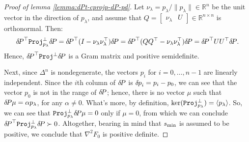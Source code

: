 \documentclass[smallcondensed]{svjour3}
\begin{document}
\begin{proof}[Proof of lemma \ref{lemma:dPt-cprojp-dP-pd}]

  Let $\nu_\lambda = p_\lambda/\|p_\lambda\| \in \mathbb{R}^n$ be the unit
  vector in the direction of $p_\lambda$, and assume that
  $Q = \begin{bmatrix} \nu_\lambda & U \end{bmatrix} \in \mathbb{R}^{n
    \times n}$ is orthonormal. Then:
  \begin{equation}
    {\delta \hspace{-0.14em} P}^\top \mathtt{Proj}^\perp_{p_\lambda} {\delta \hspace{-0.14em} P} = {\delta \hspace{-0.14em} P}^\top {(I - \nu_\lambda \nu_\lambda^\top)} {\delta \hspace{-0.14em} P} = {\delta \hspace{-0.14em} P}^\top {(QQ^\top - \nu_\lambda \nu_\lambda^\top)} {\delta \hspace{-0.14em} P} = {\delta \hspace{-0.14em} P}^\top U U^\top {\delta \hspace{-0.14em} P}.
  \end{equation}
  Hence, ${\delta \hspace{-0.14em} P}^\top \mathtt{Proj}^\perp {\delta \hspace{-0.14em} P}$ is a Gram matrix
  and positive semidefinite.

  Next, since $\Delta^n$ is nondegenerate, the vectors $p_i$ for
  $i = 0, \hdots, n - 1$ are linearly independent. Since the $i$th
  column of ${\delta \hspace{-0.14em} P}$ is ${\delta \hspace{-0.08em} p}_i = p_i - p_0$, we can see that
  the vector $p_0$ is not in the range of ${\delta \hspace{-0.14em} P}$; hence, there is
  no vector $\mu$ such that ${\delta \hspace{-0.14em} P} \mu = \alpha p_\lambda$, for any
  $\alpha \neq 0$. What's more, by definition,
  $\text{ker}(\mathtt{Proj}_{p_\lambda}^\perp) = \langle p_\lambda
  \rangle$. So, we can see that
  $\mathtt{Proj}^\perp_{p_\lambda} {\delta \hspace{-0.14em} P} \mu = 0$ only if $\mu = 0$,
  from which we can conclude
  ${\delta \hspace{-0.14em} P}^\top \mathtt{Proj}^\perp_{p_\lambda} {\delta \hspace{-0.14em} P} \succ
  0$. Altogether, bearing in mind that $s_{\operatorname{min}}$ is assumed to be
  positive, we conclude that $\nabla^2 F_0$ is positive definite.
\end{proof}
\end{document}
